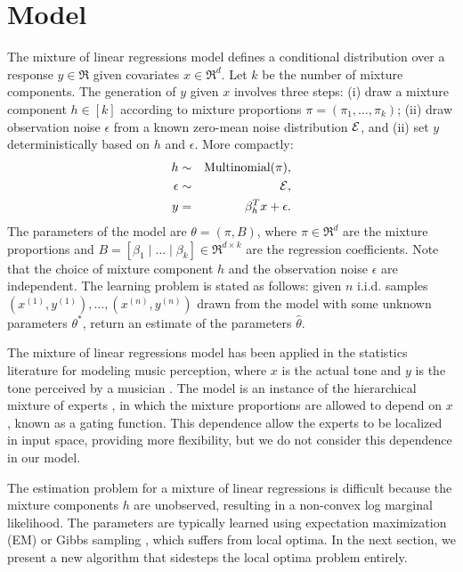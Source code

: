 \section{Model}
\label{sec:model}

\newcommand{\xn}[1]{x^{(#1)}}
\newcommand{\xni}{\xn{i}}
\newcommand{\yn}[1]{y^{(#1)}}
\newcommand{\yni}{\yn{i}}

The mixture of linear regressions model \citep{VieleTong2002} defines
a conditional distribution over a response $y \in \Re$
given covariates $x \in \Re^d$.
Let $k$ be the number of mixture components.
The generation of $y$ given $x$ involves three steps:
(i) draw a mixture component $h \in [k]$ according to mixture proportions
$\pi = (\pi_1, \dots, \pi_k)$;
(ii) draw observation noise $\epsilon$ from a known zero-mean noise distribution $\mathcal{E}$,
and (ii) set $y$ deterministically based on $h$ and $\epsilon$.
More compactly: %
\begin{eqnarray}
  h &\sim& \operatorname{Multinomial}(\pi), \\
  \epsilon &\sim& \mathcal{E}, \\
  y &=& \beta_{h}^T x + \epsilon.
\end{eqnarray}
The parameters of the model are $\theta = (\pi, B)$,
where $\pi \in \Re^d$ are the mixture proportions and
$B = [\beta_1 \mid \dots \mid \beta_k] \in \Re^{d \times k}$
are the regression coefficients.
Note that the choice of mixture component $h$ and the observation noise $\epsilon$ are independent.
The learning problem is stated as follows:
given $n$ i.i.d. samples $(\xn{1}, \yn{1}), \dots, (\xn{n}, \yn{n})$
drawn from the model with some unknown parameters $\theta^*$,
return an estimate of the parameters $\hat\theta$.

The mixture of linear regressions model has been applied
in the statistics literature for modeling music perception, where $x$ is the
actual tone and $y$ is the tone perceived by a musician \cite{VieleTong2002}.
The model is an instance of the hierarchical mixture of experts
\cite{jacobs91experts}, in which the mixture proportions are allowed to depend
on $x$, known as a gating function.
This dependence allow the experts to be localized in input space,
providing more flexibility, but we do not consider this dependence in our model.

The estimation problem for a mixture of linear regressions is difficult because
the mixture components $h$ are unobserved,
resulting in a non-convex log marginal likelihood.
The parameters are typically learned using
expectation maximization (EM) or Gibbs sampling \cite{VieleTong2002},
which suffers from local optima.
In the next section, we present a new algorithm
that sidesteps the local optima problem entirely.
